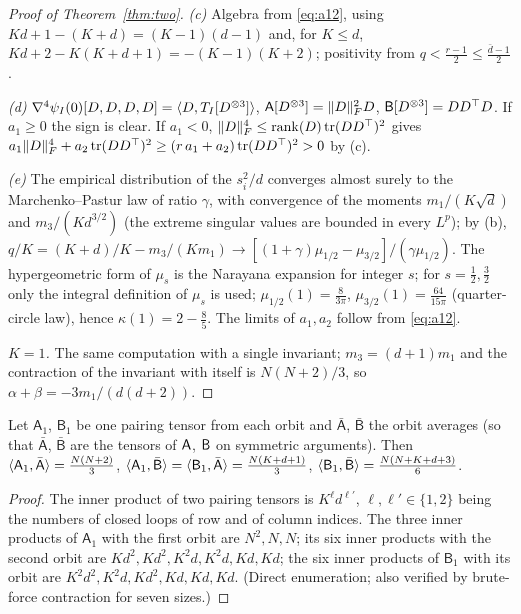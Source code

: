 \begin{proof}[Proof of Theorem~\ref{thm:two}]
\emph{(c)} Algebra from \eqref{eq:a12}, using $Kd+1-(K+d)=(K-1)(d-1)$ and, for $K\le d$,
$Kd+2-K(K+d+1)=-(K-1)(K+2)$; positivity from $q<\frac{r-1}2\le\frac{\bar d-1}2$.

\emph{(d)} $\nabla^4\psi_I(0)[D,D,D,D]=\langle D, T_I[D^{\otimes3}]\rangle$, $\mathsf{A}[D^{\otimes3}]=\|D\|_{F}^2D$,
$\mathsf{B}[D^{\otimes3}]=DD^\top D$. If $a_1\ge0$ the sign is clear. If $a_1<0$, $\|D\|_{F}^4\le\operatorname{rank}(D)\operatorname{tr}(DD^\top)^2$
gives $a_1\|D\|_{F}^4+a_2\operatorname{tr}(DD^\top)^2\ge(r\,a_1+a_2)\operatorname{tr}(DD^\top)^2>0$ by (c).

\emph{(e)} The empirical distribution of the $s_i^2/d$ converges almost surely to the Marchenko--Pastur law of ratio
$\gamma$, with convergence of the moments $m_1/(K\sqrt d)$ and $m_3/(Kd^{3/2})$ (the extreme singular values are bounded in
every $L^p$); by (b), $q/K=(K+d)/K-m_3/(Km_1)\to[(1+\gamma)\mu_{1/2}-\mu_{3/2}]/(\gamma\mu_{1/2})$. The hypergeometric
form of $\mu_s$ is the Narayana expansion for integer $s$; for $s=\frac12,\frac32$ only the integral definition of $\mu_s$ is used; $\mu_{1/2}(1)=\frac8{3\pi}$, $\mu_{3/2}(1)=\frac{64}{15\pi}$
(quarter-circle law), hence $\kappa(1)=2-\frac85$. The limits of $a_1,a_2$ follow from \eqref{eq:a12}.

\emph{$K=1$.} The same computation with a single invariant; $m_3=(d+1)m_1$ and the contraction of the invariant with
itself is $N(N+2)/3$, so $\alpha+\beta=-3m_1/(d(d+2))$.
\end{proof}

\begin{lemma}[counting]\label{lem:count}
Let $\mathsf A_1$, $\mathsf B_1$ be one pairing tensor from each orbit and $\bar{\mathsf A}$, $\bar{\mathsf B}$ the orbit
averages (so that $\bar{\mathsf A}$, $\bar{\mathsf B}$ are the tensors of $\mathsf{A}$, $\mathsf{B}$ on symmetric arguments). Then
$\langle \mathsf A_1, \bar{\mathsf A}\rangle=\frac{N(N+2)}3$, $\langle \mathsf A_1, \bar{\mathsf B}\rangle=\langle \mathsf B_1, \bar{\mathsf A}\rangle=\frac{N(K+d+1)}3$,
$\langle \mathsf B_1, \bar{\mathsf B}\rangle=\frac{N(N+K+d+3)}6$.
\end{lemma}
\begin{proof}
The inner product of two pairing tensors is $K^{\ell}d^{\ell'}$, $\ell,\ell'\in\{1,2\}$ being the numbers of closed
loops of row and of column indices. The three inner products of $\mathsf A_1$ with the first orbit are $N^2,N,N$; its
six inner products with the second orbit are $Kd^2,Kd^2,K^2d,K^2d,Kd,Kd$; the six inner products of $\mathsf B_1$ with
its orbit are $K^2d^2,K^2d,Kd^2,Kd,Kd,Kd$. (Direct enumeration; also verified by brute-force contraction for seven sizes.)
\end{proof}

